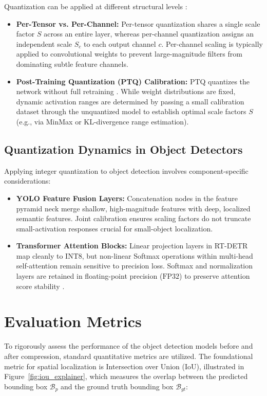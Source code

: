 Quantization can be applied at different structural levels \cite{Nagel2021}:
\begin{itemize}
    \item \textbf{Per-Tensor vs. Per-Channel:} Per-tensor quantization shares a single scale factor $S$ across an entire layer, whereas per-channel quantization assigns an independent scale $S_c$ to each output channel $c$. Per-channel scaling is typically applied to convolutional weights to prevent large-magnitude filters from dominating subtle feature channels.
    \item \textbf{Post-Training Quantization (PTQ) Calibration:} PTQ quantizes the network without full retraining \cite{Nagel2021}. While weight distributions are fixed, dynamic activation ranges are determined by passing a small calibration dataset through the unquantized model to establish optimal scale factors $S$ (e.g., via MinMax or KL-divergence range estimation).
\end{itemize}

\subsection{Quantization Dynamics in Object Detectors}

Applying integer quantization to object detection involves component-specific considerations:
\begin{itemize}
    \item \textbf{YOLO Feature Fusion Layers:} Concatenation nodes in the feature pyramid neck merge shallow, high-magnitude features with deep, localized semantic features. Joint calibration ensures scaling factors do not truncate small-activation responses crucial for small-object localization.
    \item \textbf{Transformer Attention Blocks:} Linear projection layers in RT-DETR map cleanly to $\text{INT8}$, but non-linear Softmax operations within multi-head self-attention remain sensitive to precision loss. Softmax and normalization layers are retained in floating-point precision ($\text{FP32}$) to preserve attention score stability \cite{Nagel2021}.
\end{itemize}
\section{Evaluation Metrics}
To rigorously assess the performance of the object detection models before and after compression, standard quantitative metrics are utilized. The foundational metric for spatial localization is Intersection over Union (IoU), illustrated in Figure~\ref{fig:iou_explainer}, which measures the overlap between the predicted bounding box $\mathcal{B}_p$ and the ground truth bounding box $\mathcal{B}_{gt}$:

